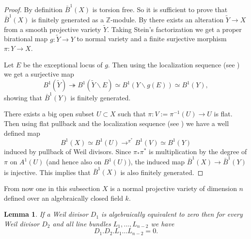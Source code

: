 \documentclass[12pt]{article}
\theoremstyle{plain}
\newtheorem{Lemma}[Thm]{\sc Lemma}
\theoremstyle{definition}
\theoremstyle{remark}
\newcommand{\ZZ}{{\mathbb Z}}
\begin{document}
\begin{proof} 
By definition $\bar B^1(X)$ is torsion free. So it is sufficient to prove that $\bar B^1(X)$ is  finitely generated as a $\ZZ$-module. By \cite{dJ} there exists an alteration $\tilde Y\to X$ from  a smooth projective variety $\tilde Y$. Taking Stein's factorization we get a proper birational map
	$g: \tilde Y\to Y$ to normal variety and a finite surjective morphism $\pi: Y\to X$.
	
	Let $E$ be the exceptional locus of $g$. Then using the localization sequence (see \cite[Example 10.3.4]{Fu}) we get a surjective map
	$$ B^1 (\tilde Y )\twoheadrightarrow B^1 (\tilde Y\backslash E)\simeq B^1 (Y\backslash g(E))
	\simeq B^1(Y),$$
showing  that $\bar B^1(Y)$ is finitely generated.
	
There exists a big open subset $U\subset X$ such that $\pi: V:=\pi^{-1}(U)\to U$ is flat.
Then using flat pullback and the localization sequence (see \cite[Proposition 10.3 and Example 10.3.4]{Fu}) we have a well defined map
$$B^1(X)\simeq B^1(U)\mathop{\longrightarrow}^{\pi^*} B^1(V)\simeq B^1(Y)$$
induced by pullback of Weil divisors. Since  $\pi_*\pi^*$ is multiplication by the degree of $\pi$ on $A^1(U)$ (and hence also on $B^1(U)$), the induced map $\bar B^1(X)\to \bar B^1(Y)$ is injective.
This implies that  $\bar B^1(X)$ is also finitely generated.
\end{proof}







\medskip

From now one in this subsection $X$ is a normal projective variety of dimension $n$ defined  over an algebraically closed field $k$. 

\begin{Lemma}
If a Weil divisor $D_1$ is algebraically equivalent to zero then for every Weil divisor $D_2$
and all line bundles $L_1,..., L_{n-2}$ we have $$D_1.D_2.L_1...L_{n-2}=0.$$
\end{Lemma} 
\end{document}

